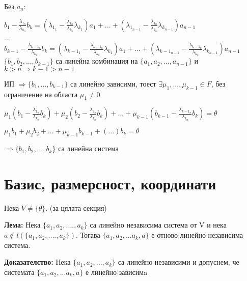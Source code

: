 \documentclass[fleqn,12pt]{article}
\begin{document}
\begin{flushleft}
Без $ a_n $:

$ b_1 - \frac{\lambda_{1_n}}{\lambda_{k_n}} b_k = (\lambda_{1_1} - \frac{\lambda_{1_n}}{\lambda_{k_n}} \lambda_{k_1}) a_1 + ... + (\lambda_{1_{n-1}} - \frac{\lambda_{1_n}}{\lambda_{k_n}} \lambda_{k_{n-1}}) a_{n-1} $\\
...\\
$ b_{k-1} - \frac{\lambda_{{k-1}_n}}{\lambda_{k_n}} b_k = (\lambda_{{k-1}_1} - \frac{\lambda_{{k-1}_n}}{\lambda_{k_n}} \lambda_{k_1}) a_1 + ... + (\lambda_{{k-1}_{n-1}} - \frac{\lambda_{{k-1}_n}}{\lambda_{k_n}} \lambda_{k_{n-1}}) a_{n-1} $\\

$ \{b_1, b_2, ..., b_{k-1} \} $ са линейна комбинация на $ \{a_1, a_2, ..., a_{n-1} \} $ и $ k > n \Rightarrow k-1 > n - 1$

\vspace{5mm}

ИП $ \Rightarrow \{ b_1, ..., b_{k-1} \} $ са линейно зависими, тоест $ \exists \mu_1, ..., \mu_{k-1} \in F$, без ограничение на областа $\mu_1 \neq 0 $

$ \mu_1 (b_1 - \frac{\lambda_{1_n}}{\lambda_{k_n}} b_k) + \mu_2 (b_2 - \frac{\lambda_{2_n}}{\lambda_{k_n}} b_k) + ... + \mu_{k-1} (b_{k-1} - \frac{\lambda_{{k-1}_n}}{\lambda_{k_n}} b_k) = \theta$

$ \mu_1 b_1 + \mu_2 b_2 + ... + \mu_{k-1} b_{k-1} + (...) b_k = \theta $

$ \Rightarrow \{ b_1, b_2, ..., b_k \} $ са линейна система


\section{Базис, размерсност, координати}
    Нека $ V \neq \{ \theta \} $. (за цялата секция)
    
    \vspace{5mm}
    
    \textbf{Лема:} Нека $\{a_1, a_2, ...., a_k\}$ са линейно независима система от V и нека $ a \notin l(\{ a_1, a_2, ...., a_k\}) $. Тогава $ \{a_1, a_2, ... a_k, a \} $ е отново линейно независима система.

    \vspace{5mm}
    
    \textbf{Доказателство:} Нека $\{a_1, a_2, ..., a_k\} $ са линейно независими и допуснем, че системата $ \{a_1, a_2, ... a_k, a \} $ е линейно зависимa

    \vspace{5mm}
    

\end{flushleft}
\end{document}
